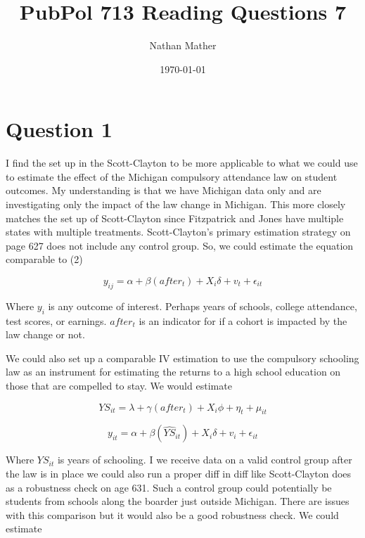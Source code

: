 \documentclass[11pt]{article}
\title{PubPol 713 Reading Questions 7} %
\author{Nathan Mather} %
\date{\today} %
\begin{document}
	
\maketitle %

\setcounter{tocdepth}{2} %



\section{Question 1}

I find the set up in the Scott-Clayton to be more applicable to what we could use to estimate the effect of the Michigan compulsory attendance law on student outcomes. My understanding is that we have Michigan data only and are investigating only the impact of the law change in Michigan. This more closely matches the set up of Scott-Clayton since Fitzpatrick and Jones have multiple states with multiple treatments. Scott-Clayton’s primary estimation strategy on page 627 does not include any control group. So, we could estimate the equation comparable to (2) 

$$ y_{ij} = \alpha + \beta(after_t) + X_i\delta + v_t + \epsilon_{it} $$

Where $y_i$ is any outcome of interest. Perhaps years of schools, college attendance, test scores, or earnings. $after_t$ is an indicator for if a cohort is impacted by the law change or not. \par 

We could also set up a comparable IV estimation to use the compulsory schooling law as an instrument for estimating the returns to a high school education on those that are compelled to stay. We would estimate 

$$ YS_{it} = \lambda + \gamma(after_t) + X_i\phi + \eta_t + \mu_{it}$$

$$y_{it} = \alpha + \beta (\widehat{YS}_{it}) + X_i\delta + v_i + \epsilon_{it}$$


Where $YS_{it}$ is years of schooling. I we receive data on a valid control group after the law is in place we could also run a proper diff in diff like Scott-Clayton does as a robustness check on age 631. Such a control group could potentially be students from schools along the boarder just outside Michigan. There are issues with this comparison but it would also be a good robustness check. We could estimate 
\end{document}
